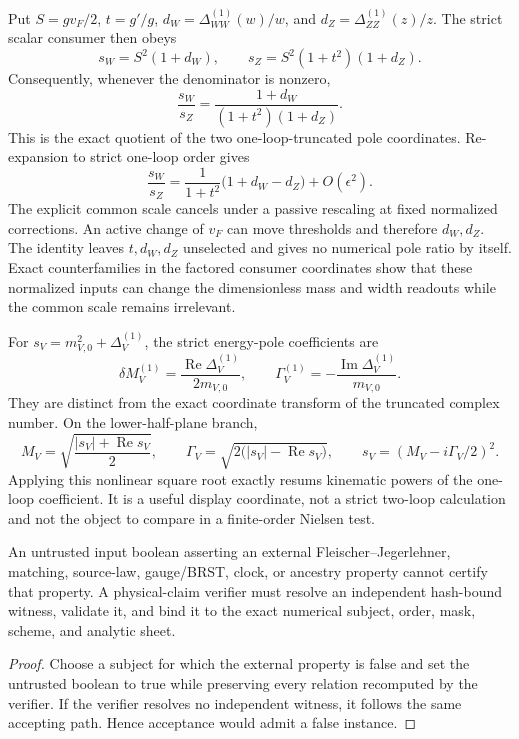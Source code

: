 Put \(S=gv_F/2\), \(t=g'/g\),
\(d_W=\Delta_{WW}^{(1)}(w)/w\), and
\(d_Z=\Delta_{ZZ}^{(1)}(z)/z\). The strict scalar consumer then obeys
\[
s_W=S^2(1+d_W),\qquad
s_Z=S^2(1+t^2)(1+d_Z).
\]
Consequently, whenever the denominator is nonzero,
\[
\frac{s_W}{s_Z}
=\frac{1+d_W}{(1+t^2)(1+d_Z)}.
\]
This is the exact quotient of the two one-loop-truncated pole coordinates.
Re-expansion to strict one-loop order gives
\[
\frac{s_W}{s_Z}
=\frac{1}{1+t^2}\bigl(1+d_W-d_Z\bigr)+O(\epsilon^2).
\]
The explicit common scale cancels under a passive rescaling at fixed
normalized corrections. An active change of \(v_F\) can move thresholds and
therefore \(d_W,d_Z\). The identity leaves \(t,d_W,d_Z\) unselected and gives
no numerical pole ratio by itself. Exact counterfamilies in the factored
consumer coordinates show that these normalized inputs can change the
dimensionless mass and width readouts while the common scale remains
irrelevant.

For \(s_V=m_{V,0}^2+\Delta_V^{(1)}\), the strict energy-pole coefficients are
\[
\delta M_V^{(1)}=\frac{\operatorname{Re}\Delta_V^{(1)}}{2m_{V,0}},
\qquad
\Gamma_V^{(1)}=-\frac{\operatorname{Im}\Delta_V^{(1)}}{m_{V,0}}.
\]
They are distinct from the exact coordinate transform of the truncated
complex number.  On the lower-half-plane branch,
\[
M_V=\sqrt{\frac{|s_V|+\operatorname{Re}s_V}{2}},\qquad
\Gamma_V=\sqrt{2\bigl(|s_V|-\operatorname{Re}s_V\bigr)},
\qquad s_V=(M_V-i\Gamma_V/2)^2.
\]
Applying this nonlinear square root exactly resums kinematic powers of the
one-loop coefficient.  It is a useful display coordinate, not a strict
two-loop calculation and not the object to compare in a finite-order Nielsen
test.

\begin{proposition}
\label{prop:wz-evidence-nonself-attestation}
An untrusted input boolean asserting an external Fleischer--Jegerlehner, matching, source-law,
gauge/BRST, clock, or ancestry property cannot certify that property.  A
physical-claim verifier must resolve an independent hash-bound witness, validate
it, and bind it to the exact numerical subject, order, mask, scheme, and
analytic sheet.
\end{proposition}

\begin{proof}
Choose a subject for which the external property is false and set the
untrusted boolean to true while preserving every relation recomputed by the
verifier.  If the verifier resolves no independent witness, it follows the
same accepting path.  Hence acceptance would admit a false instance.
\end{proof}

